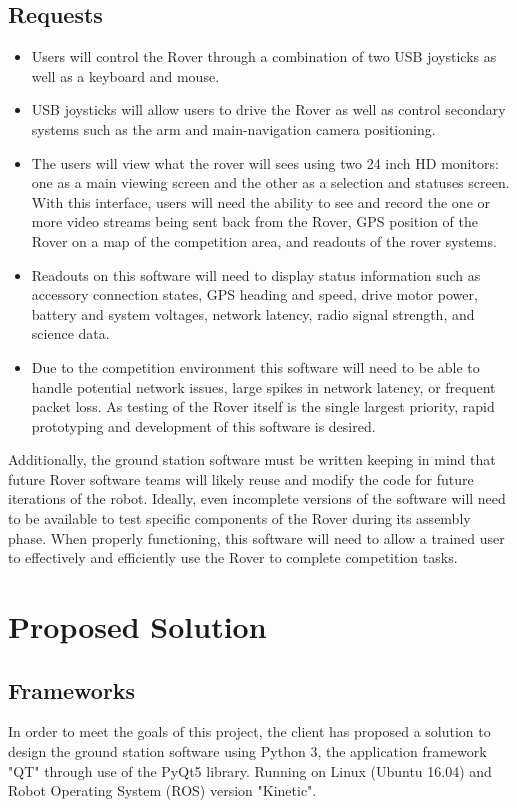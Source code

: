 \documentclass[onecolumn, draftclsnofoot, 10pt, compsoc]{IEEEtran}
\begin{document}
\subsection{Requests}
\begin{itemize}
\item Users will control the Rover through a combination of two USB joysticks as well as a keyboard and mouse.
\item USB joysticks will allow users to drive the Rover as well as control secondary systems such as the arm and main-navigation camera positioning. 
\item The users will view what the rover will sees using two 24 inch HD monitors: one as a main viewing screen and the other as a selection and statuses screen. 
With this interface, users will need the ability to see and record the one or more video streams being sent back from the Rover, GPS position of the Rover on a map of the competition area, and readouts of the rover systems.
\item Readouts on this software will need to display status information such as accessory connection states, GPS heading and speed, drive motor power, battery and system voltages, network latency, radio signal strength, and science data. 
\item Due to the competition environment this software will need to be able to handle potential network issues, large spikes in network latency, or frequent packet loss. 
As testing of the Rover itself is the single largest priority, rapid prototyping and development of this software is desired.
\end{itemize}
Additionally, the ground station software must be written keeping in mind that future Rover software teams will likely reuse and modify the code for future iterations of the robot.
Ideally, even incomplete versions of the software will need to be available to test specific components of the Rover during its assembly phase. 
When properly functioning, this software will need to allow a trained user to effectively and efficiently use the Rover to complete competition tasks.


\section{Proposed Solution}
\subsection{Frameworks}
In order to meet the goals of this project, the client has proposed a solution to design the ground station software using Python 3, the application framework "QT" through use of the PyQt5 library. Running on Linux (Ubuntu 16.04) and Robot Operating System (ROS) version "Kinetic".
\end{document}
